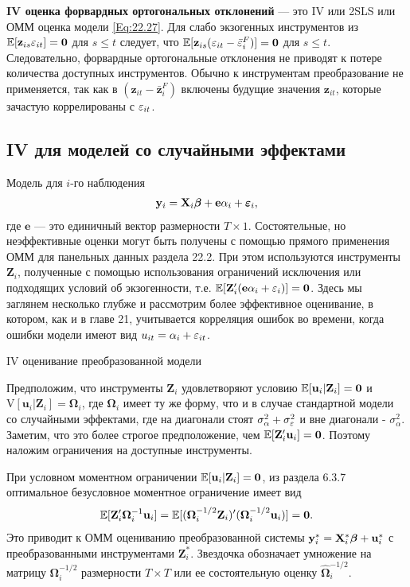 \textbf{IV оценка форвардных ортогональных отклонений} --- это IV или 2SLS или ОММ оценка модели \ref{Eq:22.27}. Для слабо экзогенных инструментов из $\mathbb{E}[\mathbf z_{is} \varepsilon_{it}]=\mathbf 0$ для $s \leq t$ следует, что $\mathbb{E}[\mathbf z_{is} (\varepsilon_{it}-\bar{\varepsilon}^F_i)]=\mathbf 0$ для $s \leq t$. Следовательно, форвардные ортогональные отклонения не приводят к потере  количества доступных инструментов. Обычно к инструментам преобразование не применяется, так как в $(\mathbf z_{it} - \bar{\mathbf z}^F_i)$ включены будущие значения $\mathbf z_{it}$, которые зачастую коррелированы с $\varepsilon_{it}$.

\subsection{IV для моделей со случайными эффектами}

Модель для $i$-го наблюдения 
\begin{align}
\mathbf y_{i}=\mathbf X_i \bm{\beta} + \mathbf e \alpha_i + \bm{\varepsilon}_i,
\nonumber
\end{align}
где $ \mathbf e$ --- это единичный вектор размерности $T \times 1$. Состоятельные, но неэффективные оценки могут быть получены с помощью прямого применения ОММ для панельных данных раздела 22.2. При этом используются инструменты $ \mathbf Z_i$, полученные с помощью использования ограничений исключения или подходящих условий об экзогенности, т.е. $\mathbb{E}[ \mathbf Z'_i( \mathbf e \alpha_i + \varepsilon_i)]= \mathbf 0$. Здесь мы заглянем несколько глубже и рассмотрим более эффективное оценивание, в котором, как и в главе 21, учитывается корреляция ошибок во времени, когда ошибки модели имеют вид $u_{it}=\alpha_i +\varepsilon_{it}$. 

{\centering  IV оценивание преобразованной модели }

Предположим, что инструменты $\mathbf Z_i$  удовлетворяют условию $\mathbb{E}[\mathbf u_i| \mathbf Z_i]=\mathbf 0$ и $\mathrm V[\mathbf u_i | \mathbf Z_i]=\bm\Omega_i$, где $\bm\Omega_i$ имеет ту же форму, что и в случае стандартной модели со случайными эффектами, где на диагонали стоят $\sigma^2_{\alpha}+\sigma^2_{\varepsilon}$ и вне диагонали - $\sigma^2_{\alpha}$. Заметим, что это более строгое предположение, чем $\mathbb{E}[\mathbf Z'_i \mathbf u_i]=\mathbf 0$. Поэтому наложим ограничения на доступные инструменты.

При условном моментном ограничении $\mathbb{E}[\mathbf u_i| \mathbf Z_i]=\mathbf 0$, из раздела 6.3.7 оптимальное безусловное моментное ограничение имеет вид
\begin{align}
\mathbb{E}[\mathbf Z'_i \bm{\Omega}^{-1}_i \mathbf u_i]= \mathbb{E}[(\bm{\Omega}^{-1/2}_i \mathbf Z_i)'(\bm{\Omega}^{-1/2}_i \mathbf u_i)]=\mathbf 0.
\nonumber
\end{align}
Это приводит к ОММ оцениванию преобразованной системы $\mathbf y^*_i=\mathbf X^*_i\bm{\beta}+\mathbf u^*_i$ с преобразованными инструментами $\mathbf Z^*_i$. Звездочка обозначает умножение на матрицу $\bm\Omega^{-1/2}_i$ размерности $T \times T$ или ее состоятельную оценку $\hat{\bm\Omega}^{-1/2}_i$.

